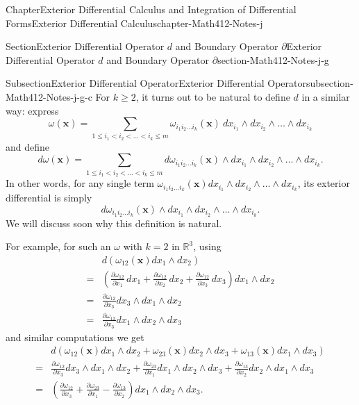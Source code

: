 \documentclass[oneside,10pt,]{book}
\numberwithin{equation}{section}
\newcommand{\bx}{\mathbf{x}}
\newcommand{\bbR}{\mathbb{R}}
\newcommand{\amp}{&}
\begin{document}
\begin{chapterptx}{Chapter}{Exterior Differential Calculus and Integration of Differential Forms}{}{Exterior Differential Calculus}{}{}{chapter-Math412-Notes-j}
\begin{sectionptx}{Section}{Exterior Differential Operator \(d\) and Boundary Operator \(\partial\)}{}{Exterior Differential Operator \(d\) and Boundary Operator \(\partial\)}{}{}{section-Math412-Notes-j-g}
\begin{subsectionptx}{Subsection}{Exterior Differential Operator}{}{Exterior Differential Operator}{}{}{subsection-Math412-Notes-j-g-c}
For \(k\ge 2\), it turns out to be natural to define \(d\) in a similar way: express%
\begin{equation*}
\omega (\bx)=\sum_{1\le i_{1} < i_{2} < \ldots < i_{k}\le m} \omega_{i_{1}i_{2}\ldots i_{k}}(\bx)\  dx_{i_{1}}\wedge dx_{i_{2}}\wedge\ldots \wedge dx_{i_{k}}
\end{equation*}
and define%
\begin{equation*}
d \omega (\bx)=\sum_{1\le i_{1} < i_{2} < \ldots < i_{k}\le m} d\omega_{i_{1}i_{2}\ldots i_{k}}(\bx)\wedge dx_{i_{1}}\wedge dx_{i_{2}}\wedge\ldots \wedge dx_{i_{k}}.
\end{equation*}
In other words, for any single term \(\omega_{i_{1}i_{2}\ldots i_{k}}(\bx) dx_{i_{1}}\wedge dx_{i_{2}}\wedge\ldots \wedge dx_{i_{k}}\), its exterior differential is simply%
\begin{equation*}
d \omega_{i_{1}i_{2}\ldots i_{k}}(\bx)\wedge dx_{i_{1}}\wedge dx_{i_{2}}\wedge\ldots \wedge dx_{i_{k}}.
\end{equation*}
We will discuss soon why this definition is natural.%
\par
For example, for such an \(\omega\) with \(k=2\) in \(\bbR^{3}\), using%
\begin{align*}
\amp d\left(\omega_{12}(\bx) dx_{1}\wedge dx_{2}\right)\\
= \amp
\left(\frac{\partial\omega_{12}}{\partial x_{1}}\, dx_{1}+ 
\frac{\partial\omega_{12}}{\partial x_{2}}\, dx_{2}+
\frac{\partial\omega_{12}}{\partial x_{3}}\, dx_{3}\right)dx_{1} \wedge dx_{2}\\
= \amp  \frac{\partial \omega_{12}}{\partial x_{3}} dx_{3} \wedge dx_{1}\wedge dx_{2}\\
= \amp  \frac{\partial \omega_{12}}{\partial x_{3}} dx_{1}\wedge dx_{2}\wedge dx_{3}
\end{align*}
and similar computations we get%
\begin{align*}
\amp d\left(\omega_{12}(\bx) dx_{1}\wedge dx_{2}+ \omega_{23}(\bx) dx_{2}\wedge dx_{3}+ 
\omega_{13}(\bx) dx_{1}\wedge dx_{3}\right)\\
=\amp 
\frac{\partial \omega_{12}}{\partial x_{3}} dx_{3} \wedge dx_{1}\wedge dx_{2}+
\frac{\partial \omega_{23}}{\partial x_{1}} dx_{1}\wedge dx_{2}\wedge dx_{3}+
\frac{\partial \omega_{13}}{\partial x_{2}} dx_{2}\wedge dx_{1}\wedge dx_{3}\\
=\amp \left( \frac{\partial \omega_{12}}{\partial x_{3}} + \frac{\partial \omega_{23}}{\partial x_{1}} -\frac{\partial \omega_{13}}{\partial x_{2}}\right) dx_{1}\wedge dx_{2}\wedge dx_{3}.

\end{align*}
\end{subsectionptx}
\end{sectionptx}
\end{chapterptx}
\end{document}
